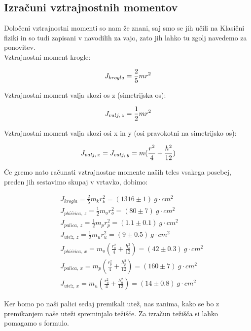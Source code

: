 \documentclass[11pt, a4paper]{article}
\theoremstyle{definition}
\theoremstyle{example}
\theoremstyle{izrek}
\begin{document}
\subsection{Izračuni vztrajnostnih momentov}
Določeni vztrajnostni momenti so nam že znani, saj smo se jih učili na Klasični fiziki in so tudi zapisani v navodilih za vajo, zato jih lahko tu zgolj navedemo za ponovitev. \\

Vztrajnostni moment krogle:

\begin{equation}
	J_{krogla} = \frac{2}{5}mr^2	
	\notag
\end{equation}

Vztrajnostni moment valja skozi os z (simetrijska os):

\begin{equation}
J_{valj,\: z} = \frac{1}{2}mr^2	
\notag
\end{equation}


Vztrajnostni moment valja skozi osi x in y (osi pravokotni na simetrijsko os):

\begin{equation}
J_{valj,\: x} = J_{valj,\: y} = m(\frac{r^2}{4} + \frac{h^2}{12})	
\notag
\end{equation}

Če gremo nato računati vztrajnostne momente naših teles vsakega posebej, preden jih sestavimo skupaj v vrtavko, dobimo: 

\begin{align*}
	& J_{krogla} = \frac{2}{5}m_kr^2_k = (1316\pm1)\: g\cdot cm^2\\
	& J_{plo\check{s}\check{c}ica,\: z} = \frac{1}{2}m_or^2_o = (80\pm7)\: g\cdot cm^2\\
	& J_{palica,\: z} = \frac{1}{2}m_pr^2_p = (1.1\pm0.1)\: g\cdot cm^2\\
	& J_{ute\check{z},\: z} = \frac{1}{2}m_ur^2_u = (9\pm0.5)\: g\cdot cm^2\\
	& J_{plo\check{s}\check{c}ica,\: x} = m_o(\frac{r^2_o}{4} + \frac{h^2_o}{12}) = (42\pm0.3)\: g\cdot cm^2\\\
	& J_{palica,\: x} = m_p(\frac{r^2_p}{4} + \frac{h^2_p}{12}) = (160\pm7)\: g\cdot cm^2\\
	& J_{ute\check{z},\: x} = m_u(\frac{r^2_u}{4} + \frac{h^2_u}{12}) = (14\pm0.8)\: g\cdot cm^2\		
\end{align*}

Ker bomo po naši palici sedaj premikali utež, nas zanima, kako se bo z premikanjem naše uteži spreminjalo težišče. Za izračun težišča si lahko pomagamo s formulo.
\end{document}
